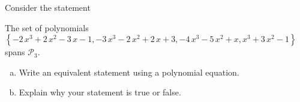 
\begin{exerciseStatement}


Consider the statement 
\begin{center}\begin{minipage}{0.8\textwidth}
 The set of polynomials \( \left\{ -2 \, x^{3} + 2 \, x^{2} - 3 \, x - 1 , -3 \, x^{3} - 2 \, x^{2} + 2 \, x + 3 , -4 \, x^{3} - 5 \, x^{2} + x , x^{3} + 3 \, x^{2} - 1 \right\} \) spans \(\mathcal{P}_3\). 
\end{minipage}\end{center}
    


\begin{enumerate}[(a)]
\item  Write an equivalent statement using a polynomial equation.
\item  Explain why your statement is true or false.
\end{enumerate}
    
\end{exerciseStatement}
    
